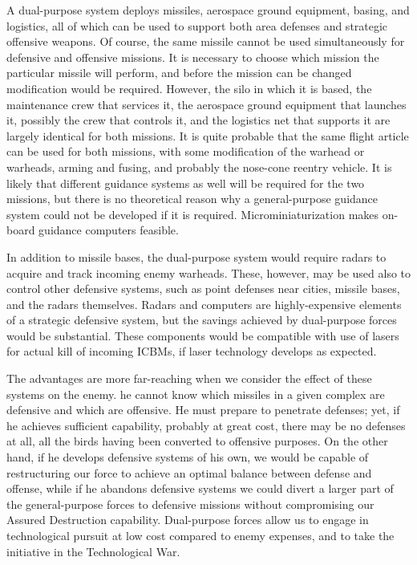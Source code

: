 A dual-purpose system deploys missiles, aerospace ground equipment, basing, and logistics, all of which can be used to support both area defenses and strategic offensive weapons. Of course, the same missile cannot be used simultaneously for defensive and offensive missions. It is necessary to choose which mission the particular missile will perform, and before the mission can be changed modification would be required. However, the silo in which it is based, the maintenance crew that services it, the aerospace ground equipment that launches it, possibly the crew that controls it, and the logistics net that supports it are largely identical for both missions. It is quite probable that the same flight article can be used for both missions, with some modification of the warhead or warheads, arming and fusing, and probably the nose-cone reentry vehicle. It is likely that different guidance systems as well will be required for the two missions, but there is no theoretical reason why a general-purpose guidance system could not be developed if it is required. Microminiaturization makes on-board guidance computers feasible.

In addition to missile bases, the dual-purpose system would require radars to acquire and track incoming enemy warheads. These, however, may be used also to control other defensive systems, such as point defenses near cities, missile bases, and the radars themselves. Radars and computers are highly-expensive elements of a strategic defensive system, but the savings achieved by dual-purpose forces would be substantial. These components would be compatible with use of lasers for actual kill of incoming ICBMs, if laser technology develops as expected.

The advantages are more far-reaching when we consider the effect of these systems on the enemy. he cannot know which missiles in a given complex are defensive and which are offensive. He must prepare to penetrate defenses; yet, if he achieves sufficient capability, probably at great cost, there may be no defenses at all, all the birds having been converted to offensive purposes. On the other hand, if he develops defensive systems of his own, we would be capable of restructuring our force to achieve an optimal balance between defense and offense, while if he abandons defensive systems we could divert a larger part of the general-purpose forces to defensive missions without compromising our Assured Destruction capability. Dual-purpose forces allow us to engage in technological pursuit at low cost compared to enemy expenses, and to take the initiative in the Technological War.

